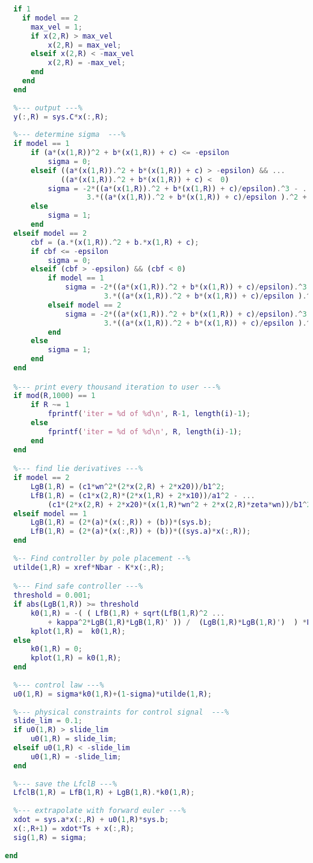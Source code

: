 \begin{lstlisting}[language=matlab]
  %--- physical constraints for velocity  ---%
  if 1
    if model == 2
      max_vel = 1;
      if x(2,R) > max_vel
          x(2,R) = max_vel;
      elseif x(2,R) < -max_vel
          x(2,R) = -max_vel;
      end
    end
  end
 
  %--- output ---%
  y(:,R) = sys.C*x(:,R);
  
  %--- determine sigma  ---% 
  if model == 1
      if (a*(x(1,R))^2 + b*(x(1,R)) + c) <= -epsilon
          sigma = 0;
      elseif ((a*(x(1,R)).^2 + b*(x(1,R)) + c) > -epsilon) && ...
             ((a*(x(1,R)).^2 + b*(x(1,R)) + c) <  0)
          sigma = -2*((a*(x(1,R)).^2 + b*(x(1,R)) + c)/epsilon).^3 - ...
                   3.*((a*(x(1,R)).^2 + b*(x(1,R)) + c)/epsilon ).^2 + 1;
      else
          sigma = 1;
      end
  elseif model == 2
      cbf = (a.*(x(1,R)).^2 + b.*x(1,R) + c);
      if cbf <= -epsilon
          sigma = 0;
      elseif (cbf > -epsilon) && (cbf < 0)
          if model == 1
              sigma = -2*((a*(x(1,R)).^2 + b*(x(1,R)) + c)/epsilon).^3 - ...
                       3.*((a*(x(1,R)).^2 + b*(x(1,R)) + c)/epsilon ).^2 + 1;
          elseif model == 2
              sigma = -2*((a*(x(1,R)).^2 + b*(x(1,R)) + c)/epsilon).^3 - ...
                       3.*((a*(x(1,R)).^2 + b*(x(1,R)) + c)/epsilon ).^2 + 1;
          end
      else
          sigma = 1;
      end 
  end

  %--- print every thousand iteration to user ---%
  if mod(R,1000) == 1 
      if R ~= 1
          fprintf('iter = %d of %d\n', R-1, length(i)-1);
      else
          fprintf('iter = %d of %d\n', R, length(i)-1);
      end
  end

  %--- find lie derivatives ---%
  if model == 2
      LgB(1,R) = (c1*wn^2*(2*x(2,R) + 2*x20))/b1^2;
      LfB(1,R) = (c1*x(2,R)*(2*x(1,R) + 2*x10))/a1^2 - ...
          (c1*(2*x(2,R) + 2*x20)*(x(1,R)*wn^2 + 2*x(2,R)*zeta*wn))/b1^2; 
  elseif model == 1
      LgB(1,R) = (2*(a)*(x(:,R)) + (b))*(sys.b);
      LfB(1,R) = (2*(a)*(x(:,R)) + (b))*((sys.a)*x(:,R));
  end
  
  %-- Find controller by pole placement --%
  utilde(1,R) = xref*Nbar - K*x(:,R);

  %--- Find safe controller ---%
  threshold = 0.001;
  if abs(LgB(1,R)) >= threshold
      k0(1,R) = -( ( LfB(1,R) + sqrt(LfB(1,R)^2 ...
          + kappa^2*LgB(1,R)*LgB(1,R)' )) /  (LgB(1,R)*LgB(1,R)')  ) *LgB(1,R);
      kplot(1,R) =  k0(1,R);
  else
      k0(1,R) = 0;
      kplot(1,R) = k0(1,R);
  end 
  
  %--- control law ---%
  u0(1,R) = sigma*k0(1,R)+(1-sigma)*utilde(1,R);
  
  %--- physical constraints for control signal  ---%
  slide_lim = 0.1;
  if u0(1,R) > slide_lim
      u0(1,R) = slide_lim;
  elseif u0(1,R) < -slide_lim
      u0(1,R) = -slide_lim;
  end
 
  %--- save the LfclB ---%
  LfclB(1,R) = LfB(1,R) + LgB(1,R).*k0(1,R);
  
  %--- extrapolate with forward euler ---%
  xdot = sys.a*x(:,R) + u0(1,R)*sys.b;
  x(:,R+1) = xdot*Ts + x(:,R);
  sig(1,R) = sigma;
  
end
\end{lstlisting}
